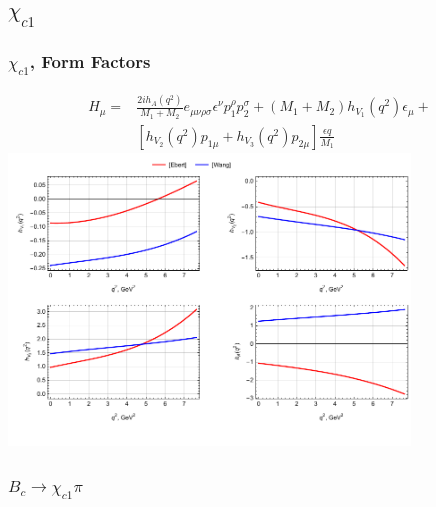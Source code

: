 \documentclass{beamer}
\begin{document}
\subsection{$\chi_{c1}$}
\begin{frame}
  \frametitle{$\chi_{c1}$, Form Factors}
  \begin{align*}
    H_\mu =& \frac{2i h_A(q^2)}{M_1+M_2}e_{\mu\nu\rho\sigma}\epsilon^\nu p_1^\rho p_2^\sigma
             + (M_1+M_2) h_{V_1}(q^2)\epsilon_\mu + \\
     & [h_{V_2}(q^2)p_{1\mu} + h_{V_3}(q^2)p_{2\mu}]\frac{\epsilon q}{M_1}
  \end{align*}
  \includegraphics[width=0.8\textwidth]{figs/ff_chi_c1}
\end{frame}

\begin{frame}
  \frametitle{$B_c \to \chi_{c1} \pi$}
  \begin{columns}
    \begin{column}{0.5\textwidth}
      \centering{[Ebert]:}
      
    \end{column}
    \begin{column}{0.5\textwidth}
      \centering{[Wang]:}
      
    \end{column}
  \end{columns}
\end{frame}
\end{document}
